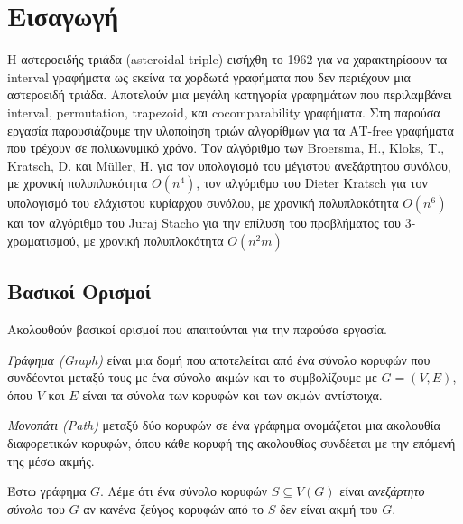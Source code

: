 \chapter{Εισαγωγή}
\label{ch:Introduction}

Η αστεροειδής τριάδα (asteroidal triple) εισήχθη το 1962 για να χαρακτηρίσουν τα interval γραφήματα ως εκείνα τα χορδωτά γραφήματα που δεν περιέχουν μια αστεροειδή τριάδα\cite{ref-20-independent-sets}. Αποτελούν μια μεγάλη κατηγορία γραφημάτων που περιλαμβάνει interval, permutation, trapezoid, και cocomparability γραφήματα.
Στη παρούσα εργασία παρουσιάζουμε την υλοποίηση τριών αλγορίθμων για τα ΑΤ-free γραφήματα που τρέχουν σε πολυωνυμικό χρόνο. Τον αλγόριθμο των Broersma, H., Kloks, T., Kratsch, D. και Müller, H.\cite{at-free-independent-sets} για τον υπολογισμό του μέγιστου ανεξάρτητου συνόλου, με χρονική πολυπλοκότητα $O(n^4)$, τον αλγόριθμο του Dieter Kratsch\cite{at-free-domination} για τον υπολογισμό του ελάχιστου κυρίαρχου συνόλου, με χρονική πολυπλοκότητα $O(n^6)$ και τον αλγόριθμο του Juraj Stacho\cite{at-free-3-colouring} για την επίλυση του προβλήματος του 3-χρωματισμού, με χρονική πολυπλοκότητα $O(n^2m)$

\section{Βασικοί Ορισμοί}
\label{sec:Definitions}

Ακολουθούν βασικοί ορισμοί που απαιτούνται για την παρούσα εργασία.

\begin{definition}
	\textit{Γράφημα (Graph)} είναι μια δομή που αποτελείται από ένα σύνολο κορυφών που συνδέονται μεταξύ τους με ένα σύνολο ακμών και το συμβολίζουμε με $G =(V,E)$, όπου $V$ και $E$ είναι τα σύνολα των κορυφών και των ακμών αντίστοιχα. 
\end{definition}


\begin{definition}
	\textit{Μονοπάτι (Path)} μεταξύ δύο κορυφών σε ένα γράφημα ονομάζεται μια ακολουθία διαφορετικών κορυφών, όπου κάθε κορυφή της ακολουθίας συνδέεται με την επόμενή της μέσω ακμής.
\end{definition}

\begin{definition}
	Έστω γράφημα $G$. Λέμε ότι ένα σύνολο κορυφών $S \subseteq V(G)$ είναι \textit{ανεξάρτητο σύνολο} του $G$ αν κανένα ζεύγος κορυφών από το $S$ δεν είναι ακμή του $G$. 
\end{definition}

